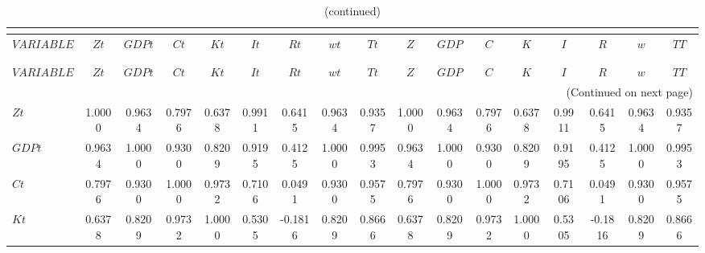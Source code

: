  
\begin{center}
\begin{longtable}{lcccccccccccccccc} 
\caption{CORRELATION OF SIMULATED VARIABLES}\\
 \label{Table:sim_corr_matrix}\\
\toprule 
$VARIABLE  $	 & 	 $        Zt$	 & 	 $      GDPt$	 & 	 $        Ct$	 & 	 $        Kt$	 & 	 $        It$	 & 	 $        Rt$	 & 	 $        wt$	 & 	 $        Tt$	 & 	 $         Z$	 & 	 $       GDP$	 & 	 $         C$	 & 	 $         K$	 & 	 $         I$	 & 	 $         R$	 & 	 $         w$	 & 	 $        TT$\\
\midrule \endfirsthead 
\caption{(continued)}\\
 \toprule \\ 
$VARIABLE  $	 & 	 $        Zt$	 & 	 $      GDPt$	 & 	 $        Ct$	 & 	 $        Kt$	 & 	 $        It$	 & 	 $        Rt$	 & 	 $        wt$	 & 	 $        Tt$	 & 	 $         Z$	 & 	 $       GDP$	 & 	 $         C$	 & 	 $         K$	 & 	 $         I$	 & 	 $         R$	 & 	 $         w$	 & 	 $        TT$\\
\midrule \endhead 
\midrule \multicolumn{17}{r}{(Continued on next page)} \\ \bottomrule \endfoot 
\bottomrule \endlastfoot 
$Zt        $	 & 	    1.0000	 & 	    0.9634	 & 	    0.7976	 & 	    0.6378	 & 	    0.9911	 & 	    0.6415	 & 	    0.9634	 & 	    0.9357	 & 	    1.0000	 & 	    0.9634	 & 	    0.7976	 & 	    0.6378	 & 	    0.9911	 & 	    0.6415	 & 	    0.9634	 & 	    0.9357 \\ 
$GDPt      $	 & 	    0.9634	 & 	    1.0000	 & 	    0.9300	 & 	    0.8209	 & 	    0.9195	 & 	    0.4125	 & 	    1.0000	 & 	    0.9953	 & 	    0.9634	 & 	    1.0000	 & 	    0.9300	 & 	    0.8209	 & 	    0.9195	 & 	    0.4125	 & 	    1.0000	 & 	    0.9953 \\ 
$Ct        $	 & 	    0.7976	 & 	    0.9300	 & 	    1.0000	 & 	    0.9732	 & 	    0.7106	 & 	    0.0491	 & 	    0.9300	 & 	    0.9575	 & 	    0.7976	 & 	    0.9300	 & 	    1.0000	 & 	    0.9732	 & 	    0.7106	 & 	    0.0491	 & 	    0.9300	 & 	    0.9575 \\ 
$Kt        $	 & 	    0.6378	 & 	    0.8209	 & 	    0.9732	 & 	    1.0000	 & 	    0.5305	 & 	   -0.1816	 & 	    0.8209	 & 	    0.8666	 & 	    0.6378	 & 	    0.8209	 & 	    0.9732	 & 	    1.0000	 & 	    0.5305	 & 	   -0.1816	 & 	    0.8209	 & 	    0.8666 \\ 

\end{longtable}
\end{center}
